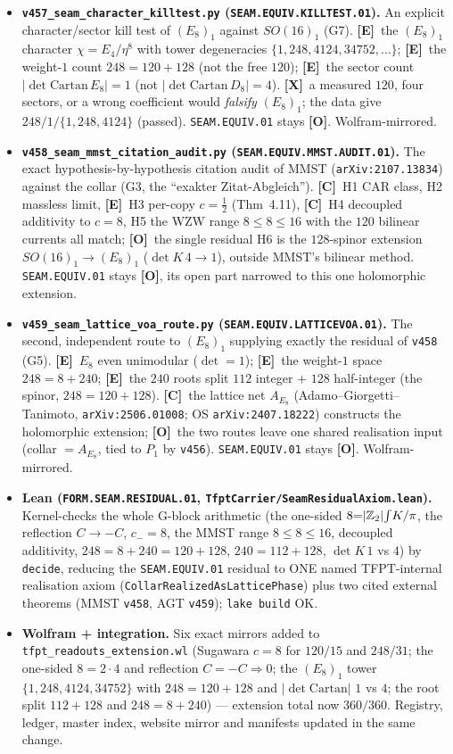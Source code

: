 \documentclass[11pt]{article}
\providecommand{\mE}{\textbf{[E]}}\providecommand{\mC}{\textbf{[C]}}
\providecommand{\mO}{\textbf{[O]}}\providecommand{\mX}{\textbf{[X]}}
\begin{document}
\begin{itemize}
\item \textbf{\texttt{v457\_seam\_character\_killtest.py} (\texttt{SEAM.EQUIV.KILLTEST.01}).} An explicit
character/sector kill test of $(E_8)_1$ against $SO(16)_1$ (G7). \mE\ the $(E_8)_1$ character $\chi{=}E_4/\eta^8$
with tower degeneracies $\{1,248,4124,34752,\dots\}$; \mE\ the weight-$1$ count $248{=}120{+}128$ (not the free $120$); \mE\ the sector
count $|\!\det\mathrm{Cartan}\,E_8|{=}1$ (not $|\!\det\mathrm{Cartan}\,D_8|{=}4$). \mX\ a measured $120$, four sectors,
or a wrong coefficient would \emph{falsify} $(E_8)_1$; the data give $248/1/\{1,248,4124\}$ (passed).
\texttt{SEAM.EQUIV.01} stays \mO. Wolfram-mirrored.
\item \textbf{\texttt{v458\_seam\_mmst\_citation\_audit.py} (\texttt{SEAM.EQUIV.MMST.AUDIT.01}).} The exact
hypothesis-by-hypothesis citation audit of MMST (\texttt{arXiv:2107.13834}) against the collar (G3, the ``exakter
Zitat-Abgleich''). \mC\ H1 CAR class, H2 massless limit, \mE\ H3 per-copy $c{=}\tfrac12$ (Thm~4.11), \mC\ H4 decoupled
additivity to $c{=}8$, H5 the WZW range $8{\le}8{\le}16$ with the $120$ bilinear currents all match; \mO\ the single
residual H6 is the $128$-spinor extension $SO(16)_1{\to}(E_8)_1$ ($\det K\,4{\to}1$), outside MMST's bilinear method.
\texttt{SEAM.EQUIV.01} stays \mO, its open part narrowed to this one holomorphic extension.
\item \textbf{\texttt{v459\_seam\_lattice\_voa\_route.py} (\texttt{SEAM.EQUIV.LATTICEVOA.01}).} The second, independent
route to $(E_8)_1$ supplying exactly the residual of \texttt{v458} (G5). \mE\ $E_8$ even unimodular ($\det{=}1$); \mE\
the weight-$1$ space $248{=}8{+}240$; \mE\ the $240$ roots split $112$ integer $+$ $128$ half-integer (the spinor,
$248{=}120{+}128$). \mC\ the lattice net $A_{E_8}$ (Adamo--Giorgetti--Tanimoto, \texttt{arXiv:2506.01008}; OS
\texttt{arXiv:2407.18222}) constructs the holomorphic extension; \mO\ the two routes leave one shared realisation input
(collar $={}A_{E_8}$, tied to $P_1$ by \texttt{v456}). \texttt{SEAM.EQUIV.01} stays \mO. Wolfram-mirrored.
\item \textbf{Lean (\texttt{FORM.SEAM.RESIDUAL.01}, \texttt{TfptCarrier/SeamResidualAxiom.lean}).} Kernel-checks the
whole G-block arithmetic (the one-sided $8{=}|\mathbb{Z}_2|\!\int\!K/\pi$, the reflection $C{\to}{-}C$, $c_-{=}8$, the MMST
range $8{\le}8{\le}16$, decoupled additivity, $248{=}8{+}240{=}120{+}128$, $240{=}112{+}128$, $\det K\,1$ vs $4$) by
\texttt{decide}, reducing the \texttt{SEAM.EQUIV.01} residual to ONE named TFPT-internal realisation axiom
(\texttt{CollarRealizedAsLatticePhase}) plus two cited external theorems (MMST \texttt{v458}, AGT \texttt{v459});
\texttt{lake build} OK.
\item \textbf{Wolfram + integration.} Six exact mirrors added to \texttt{tfpt\_readouts\_extension.wl} (Sugawara
$c{=}8$ for $120/15$ and $248/31$; the one-sided $8{=}2\cdot4$ and reflection $C{=}{-}C\Rightarrow0$; the $(E_8)_1$
tower $\{1,248,4124,34752\}$ with $248{=}120{+}128$ and $|\!\det\mathrm{Cartan}|$ $1$ vs $4$; the root split
$112{+}128$ and $248{=}8{+}240$) --- extension total now $360/360$. Registry, ledger, master index, website mirror and
manifests updated in the same change.
\end{itemize}
\end{document}

